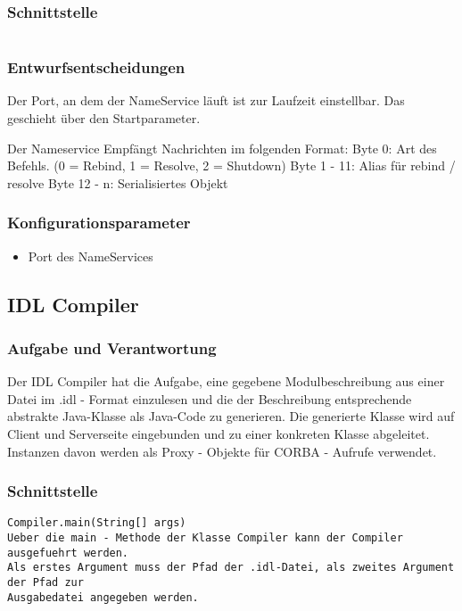 \documentclass{article}
\begin{document}
\subsubsection{Schnittstelle}
\begin{lstlisting}

\end{lstlisting}

\subsubsection{Entwurfsentscheidungen}
Der Port, an dem der NameService läuft ist zur Laufzeit einstellbar. Das geschieht über
den Startparameter.

Der Nameservice Empfängt Nachrichten im folgenden Format:\newline
Byte 0: Art des Befehls. (0 = Rebind, 1 = Resolve, 2 = Shutdown)
Byte 1 - 11: Alias für rebind / resolve
Byte 12 - n: Serialisiertes Objekt

\subsubsection{Konfigurationsparameter}
\begin{itemize}
    \item Port des NameServices
\end{itemize}

\subsection{IDL Compiler}
\subsubsection{Aufgabe und Verantwortung}
Der IDL Compiler hat die Aufgabe, eine gegebene Modulbeschreibung aus einer Datei
im .idl - Format einzulesen und die der Beschreibung entsprechende abstrakte Java-Klasse 
als Java-Code zu generieren. Die generierte Klasse wird auf Client und Serverseite eingebunden
und zu einer konkreten Klasse abgeleitet. Instanzen davon werden als Proxy - Objekte
für CORBA - Aufrufe verwendet.


\subsubsection{Schnittstelle}
\begin{lstlisting}
Compiler.main(String[] args)
Ueber die main - Methode der Klasse Compiler kann der Compiler ausgefuehrt werden.
Als erstes Argument muss der Pfad der .idl-Datei, als zweites Argument der Pfad zur 
Ausgabedatei angegeben werden.
\end{lstlisting}
\end{document}
